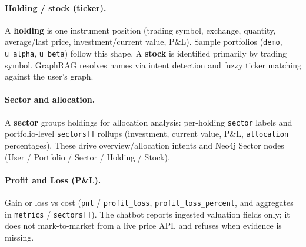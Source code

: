 \paragraph{Holding / stock (ticker).}
A \textbf{holding} is one instrument position (trading symbol, exchange, quantity, average/last price, investment/current value, P\&L). Sample portfolios (\texttt{demo}, \texttt{u\_alpha}, \texttt{u\_beta}) follow this shape. A \textbf{stock} is identified primarily by trading symbol. GraphRAG resolves names via intent detection and fuzzy ticker matching against the user's graph.

\paragraph{Sector and allocation.}
A \textbf{sector} groups holdings for allocation analysis: per-holding \texttt{sector} labels and portfolio-level \texttt{sectors[]} rollups (investment, current value, P\&L, \texttt{allocation} percentages). These drive overview/allocation intents and Neo4j Sector nodes (User / Portfolio / Sector / Holding / Stock).

\paragraph{Profit and Loss (P\&L).}
Gain or loss vs cost (\texttt{pnl} / \texttt{profit\_loss}, \texttt{profit\_loss\_percent}, and aggregates in \texttt{metrics} / \texttt{sectors[]}). The chatbot reports ingested valuation fields only; it does not mark-to-market from a live price API, and refuses when evidence is missing.
